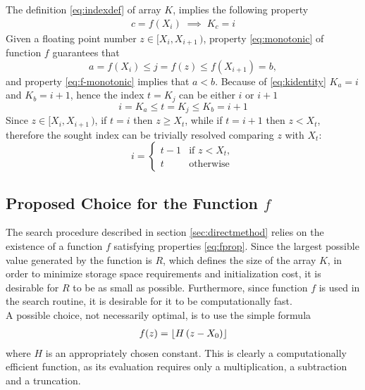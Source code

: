 \documentclass[preprint,1p,times]{elsarticle}
\begin{document}
\noindent The definition \eqref{eq:indexdef} of array $K$, implies the following property
\begin{align}
\label{eq:kidentity}
   c=f(X_i) \; \implies \; K_c=i
\end{align}
Given a floating point number $z\in[X_{i},X_{i+1}\,)$, property \eqref{eq:monotonic} of function $f$ guarantees that
$$
 	a=f(X_{i}) \leq j=f(z) \leq f(X_{i+1})=b,
$$
and property \eqref{eq:f-monotonic} implies that $a<b$. Because of \eqref{eq:kidentity} $K_a=i$ and $K_b=i+1$, hence the index $t=K_j$ can be either $i$ or $i+1$
$$i = K_a \leq t=K_j \leq K_b = i+1$$
Since $z\in[X_{i},X_{i+1}\,)$, if $t=i$ then $z \geq X_t$, while if $t=i+1$ then $z<X_t$, therefore the sought index can be trivially resolved comparing $z$ with $X_t$:
$$
i = 
\left\{
	\begin{array}{ll}
		t-1 & \text{if } z < X_t,  \\
		t   & \text{otherwise}
	\end{array}
\right.
$$

\subsection{Proposed Choice for the Function $f$}
\label{sec:constructf}
The search procedure described in section \ref{sec:directmethod} relies on the existence of a function $f$ satisfying properties \eqref{eq:fprop}. Since the largest possible value generated by the function is $R$, which defines the size of the array $K$, in order to minimize storage space requirements and initialization cost, it is desirable for $R$ to be as small as possible. Furthermore, since function $f$ is used in the search routine, it is desirable for it to be computationally fast. \\

A possible choice, not necessarily optimal, is to use the simple formula
\begin{align}
\label{eq:function}
	f(z) = \left \lfloor  H\, (z-X_0)  \right \rfloor
\end{align}
where $H$ is an appropriately chosen constant.  This is clearly a computationally efficient function, as its evaluation requires only a multiplication, a subtraction and a truncation.
\end{document}
